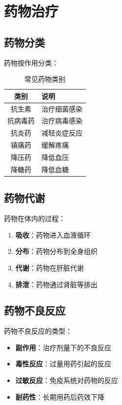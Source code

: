 \documentclass[12pt,UTF8]{ctexbook}
\begin{document}
\chapter{药物治疗}
\label{chap:pharmacotherapy}

\section{药物分类}
\label{sec:drug_classification}

药物按作用分类：
\begin{table}[htbp]
    \centering
    \caption{常见药物类别}
    \begin{tabular}{|c|p{8cm}|}
        \hline
        \textbf{类别} & \textbf{说明} \\
        \hline
        抗生素 & 治疗细菌感染 \\
        \hline
        抗病毒药 & 治疗病毒感染 \\
        \hline
        抗炎药 & 减轻炎症反应 \\
        \hline
        镇痛药 & 缓解疼痛 \\
        \hline
        降压药 & 降低血压 \\
        \hline
        降糖药 & 降低血糖 \\
        \hline
    \end{tabular}
\end{table}

\section{药物代谢}
\label{sec:drug_metabolism}

药物在体内的过程：
\begin{enumerate}
    \item \textbf{吸收}：药物进入血液循环
    \item \textbf{分布}：药物分布到全身组织
    \item \textbf{代谢}：药物在肝脏代谢
    \item \textbf{排泄}：药物通过肾脏等排出
\end{enumerate}

\section{药物不良反应}
\label{sec:adverse_reactions}

药物不良反应的类型：
\begin{itemize}
    \item \textbf{副作用}：治疗剂量下的不良反应
    \item \textbf{毒性反应}：过量用药引起的反应
    \item \textbf{过敏反应}：免疫系统对药物的反应
    \item \textbf{耐药性}：长期用药后药效下降
\end{itemize}
\end{document}
